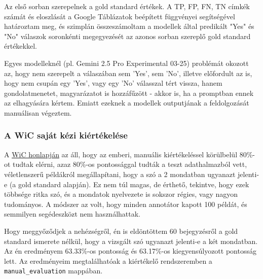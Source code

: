 \documentclass[12pt]{report}
\theoremstyle{definition}
\begin{document}


Az első sorban szerepelnek a gold standard értékek.
A TP, FP, FN, TN címkék számát és eloszlását a Google Táblázatok beépített függvényei segítségével határoztam meg, és szimplán összeszámoltam a modellek által predikált "Yes" és "No" válaszok soronkénti megegyezését az azonos sorban szereplő gold standard értékekkel.

Egyes modelleknél (pl. Gemini 2.5 Pro Experimental 03-25) problémát okozott az, hogy nem szerepelt a válaszában sem 'Yes', sem 'No', illetve előfordult az is, hogy nem csupán egy 'Yes', vagy egy 'No' válasszal tért vissza, hanem gondolatmenetet, magyarázatot is hozzáfűzött - akkor is, ha a promptban ennek az elhagyására kértem. %
Emiatt ezeknek a modellek outputjának a feldolgozását manuálisan végeztem.


\subsubsection{A WiC saját kézi kiértékelése}
A \href{https://pilehvar.github.io/wic/}{WiC honlapján} az áll, hogy az emberi, manuális kiértékeléssel körülbelül 80\%-ot tudtak elérni, azaz 80\%-os pontossággal tudták a teszt adathalmazból vett, véletlenszerű példákról megállapítani, hogy a szó a 2 mondatban ugyanazt jelenti-e (a gold standard alapján). Ez nem túl magas, de érthető, tekintve, hogy ezek többsége ritka szó, és a mondatok nyelvezete is sokszor régies, vagy nagyon tudományos. A módszer az volt, hogy minden annotátor kapott 100 példát, és semmilyen segédeszközt nem használhattak.

Hogy meggyőződjek a nehézségről, én is eldöntöttem 60 bejegyzésről a gold standard ismerete nélkül, hogy a vizsgált szó ugyanazt jelenti-e a két mondatban. Az én eredményem 63.33\%-os pontosság és 63.17\%-os kiegyensúlyozott pontosság lett. Az eredményeim megtalálhatóak a kiértékelő rendszeremben a \texttt{manual\_evaluation} mappában.
\end{document}
